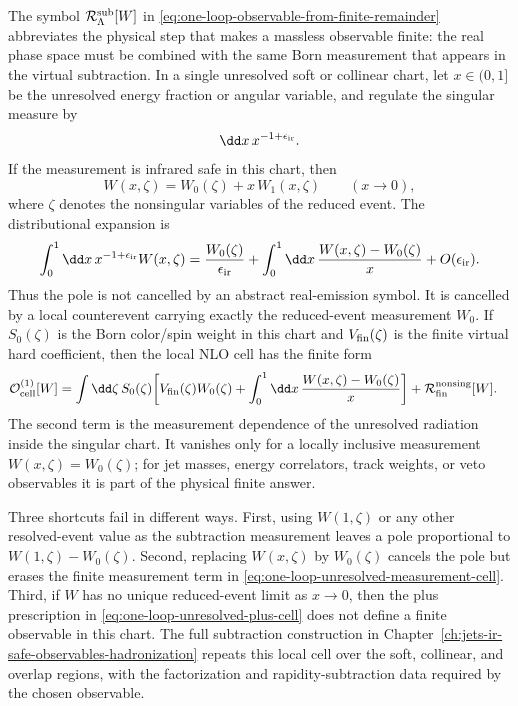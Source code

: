 \begin{controlledapproximation}
\label{ca:one-loop-unresolved-measurement-cell}
The symbol \(\mathcal R_\Lambda^{\rm sub}[W]\) in
\eqref{eq:one-loop-observable-from-finite-remainder} abbreviates the physical
step that makes a massless observable finite: the real phase space must be
combined with the same Born measurement that appears in the virtual subtraction.  In a
single unresolved soft or collinear chart, let \(x\in(0,1]\) be the unresolved
energy fraction or angular variable, and regulate the singular measure by
\[
  \dd x\,x^{-1+\epsilon_{\rm ir}} .
\]
If the measurement is infrared safe in this chart, then
\[
  W(x,\zeta)
  =
  W_0(\zeta)+x\,W_1(x,\zeta)
  \qquad (x\to0),
\]
where \(\zeta\) denotes the nonsingular variables of the reduced event.  The
distributional expansion is
\begin{equation}
  \int_0^1\dd x\,x^{-1+\epsilon_{\rm ir}}W(x,\zeta)
  =
  \frac{W_0(\zeta)}{\epsilon_{\rm ir}}
  +
  \int_0^1\dd x\,\frac{W(x,\zeta)-W_0(\zeta)}{x}
  +O(\epsilon_{\rm ir}).
  \label{eq:one-loop-unresolved-plus-cell}
\end{equation}
Thus the pole is not cancelled by an abstract real-emission symbol.  It is
cancelled by a local counterevent carrying exactly the reduced-event
measurement \(W_0\).  If \(S_0(\zeta)\) is the Born color/spin weight in this
chart and \(V_{\rm fin}(\zeta)\) is the finite virtual hard coefficient, then
the local NLO cell has the finite form
\begin{equation}
\begin{aligned}
  \mathcal O_{\rm cell}^{(1)}[W]
  &=
  \int\dd\zeta\,S_0(\zeta)
  \biggl[
    V_{\rm fin}(\zeta)W_0(\zeta)
    +
    \int_0^1\dd x\,
      \frac{W(x,\zeta)-W_0(\zeta)}{x}
  \biggr]
  +
  \mathcal R_{\rm fin}^{\rm nonsing}[W].
\end{aligned}
  \label{eq:one-loop-unresolved-measurement-cell}
\end{equation}
The second term is the measurement dependence of the unresolved radiation
inside the singular chart.  It vanishes only for a locally inclusive
measurement \(W(x,\zeta)=W_0(\zeta)\); for jet masses, energy correlators,
track weights, or veto observables it is part of the physical finite answer.

Three shortcuts fail in different ways.  First, using \(W(1,\zeta)\) or any
other resolved-event value as the subtraction measurement leaves a pole
proportional to \(W(1,\zeta)-W_0(\zeta)\).  Second, replacing \(W(x,\zeta)\) by
\(W_0(\zeta)\) cancels the pole but erases the finite measurement term in
\eqref{eq:one-loop-unresolved-measurement-cell}.  Third, if \(W\) has no
unique reduced-event limit as \(x\to0\), then the plus prescription in
\eqref{eq:one-loop-unresolved-plus-cell} does not define a finite observable in
this chart.  The full subtraction construction in
Chapter~\ref{ch:jets-ir-safe-observables-hadronization} repeats this local
cell over the soft, collinear, and overlap regions, with the factorization and
rapidity-subtraction data required by the chosen observable.
\end{controlledapproximation}

